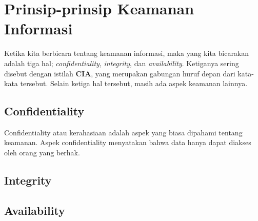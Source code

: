 \chapter{Prinsip-prinsip Keamanan Informasi}
Ketika kita berbicara tentang keamanan informasi, maka yang kita
bicarakan adalah tiga hal;
{\em confidentiality}, {\em integrity}, dan {\em availability}.
Ketiganya sering disebut dengan istilah \textbf{CIA},
yang merupakan gabungan huruf depan dari kata-kata tersebut.
Selain ketiga hal tersebut, masih ada aspek keamanan lainnya.

\section{Confidentiality}
Confidentiality atau kerahasiaan adalah aspek yang biasa dipahami
tentang keamanan.
Aspek confidentiality menyatakan bahwa data hanya dapat diakses
oleh orang yang berhak.

\section{Integrity}

\section{Availability}
